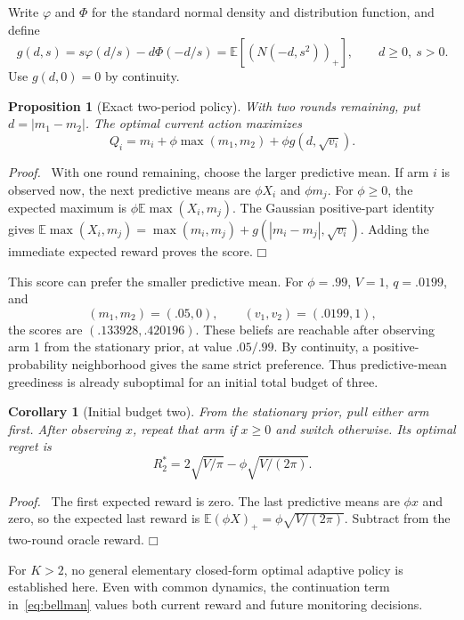 \documentclass[11pt]{article}
\newtheorem{proposition}[theorem]{Proposition}
\newtheorem{corollary}[theorem]{Corollary}
\newenvironment{proof}{\par\noindent\textit{Proof.}\ }{\hfill$\mdlgwhtsquare$\par\medskip}
\newcommand{\E}{\mathbb E}
\begin{document}
Write $\varphi$ and $\Phi$ for the standard normal density and distribution function, and define
\begin{equation}
g(d,s)=s\varphi(d/s)-d\Phi(-d/s)
=\E[(N(-d,s^2))_+],\qquad d\geq0,\ s>0.
\end{equation}
Use $g(d,0)=0$ by continuity.

\begin{proposition}[Exact two-period policy]
With two rounds remaining, put $d=|m_1-m_2|$. The optimal current action maximizes
\begin{equation}
Q_i=m_i+\phi\max(m_1,m_2)+\phi g(d,\sqrt{v_i}).
\label{eq:two}
\end{equation}
\end{proposition}
\begin{proof}
With one round remaining, choose the larger predictive mean. If arm $i$ is observed now, the next predictive means are $\phi X_i$ and $\phi m_j$. For $\phi\geq0$, the expected maximum is
$\phi\E\max(X_i,m_j)$. The Gaussian positive-part identity gives
$\E\max(X_i,m_j)=\max(m_i,m_j)+g(|m_i-m_j|,\sqrt{v_i})$.
Adding the immediate expected reward proves the score.
\end{proof}

This score can prefer the smaller predictive mean. For $\phi=.99$, $V=1$, $q=.0199$, and
\[
(m_1,m_2)=(.05,0),\qquad (v_1,v_2)=(.0199,1),
\]
the scores are $(.133928,.420196)$. These beliefs are reachable after observing arm 1 from the stationary prior, at value $.05/.99$. By continuity, a positive-probability neighborhood gives the same strict preference. Thus predictive-mean greediness is already suboptimal for an initial total budget of three.

\begin{corollary}[Initial budget two]
From the stationary prior, pull either arm first. After observing $x$, repeat that arm if $x\geq0$ and switch otherwise. Its optimal regret is
\begin{equation}
\boxed{R_2^*=2\sqrt{V/\pi}-\phi\sqrt{V/(2\pi)}.}
\label{eq:R2}
\end{equation}
\end{corollary}
\begin{proof}
The first expected reward is zero. The last predictive means are $\phi x$ and zero, so the expected last reward is $\E(\phi X)_+=\phi\sqrt{V/(2\pi)}$. Subtract from the two-round oracle reward.
\end{proof}
For $K>2$, no general elementary closed-form optimal adaptive policy is established here. Even with common dynamics, the continuation term in~\eqref{eq:bellman} values both current reward and future monitoring decisions.
\end{document}
